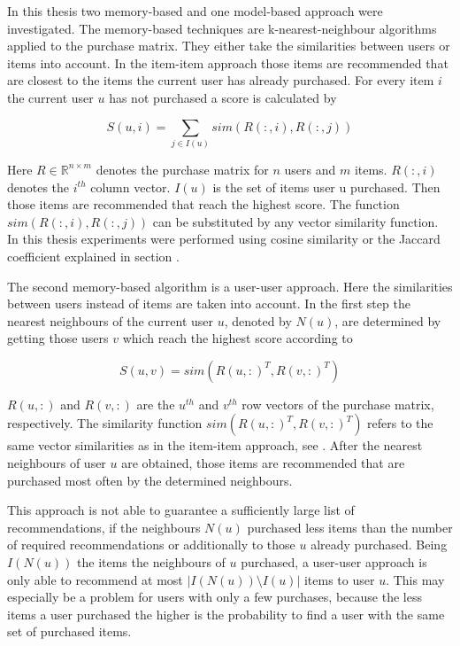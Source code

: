 \documentclass[10pt]{reportMaster}
\begin{document}
In this thesis two memory-based and one model-based approach were investigated.
The memory-based techniques are k-nearest-neighbour algorithms applied to the purchase matrix.
They either take the similarities between users or items into account. %
In the item-item approach those items are recommended that are closest to the items the current user has already purchased.
For every item $i$ the current user $u$ has not purchased a score is calculated by

\begin{equation}
	 S(u,i) = \sum_{j \in I(u)}{sim(R(:,i), R(:,j))}
\end{equation}

Here $R \in \mathds{R}^{n \times m}$ denotes the purchase matrix for $n$ users and $m$ items. $R(:,i)$ denotes the $i^{th}$ column vector. $I(u)$ is the set of items user u purchased.
Then those items are recommended that reach the highest score. %
The function $sim(R(:,i), R(:,j))$ can be substituted by any vector similarity function.
In this thesis experiments were performed using cosine similarity or the Jaccard coefficient explained in section . %

The second memory-based algorithm is a user-user approach.
Here the similarities between users instead of items are taken into account.
In the first step the nearest neighbours of the current user $u$, denoted by $N(u)$, are determined by getting those users $v$ which reach the highest score according to

\begin{equation}
	S(u,v) = sim(R(u,:)^T, R(v, :)^T)
\end{equation}

$R(u,:)$ and $R(v,:)$ are the $u^{th}$ and $v^{th}$ row vectors of the purchase matrix, respectively.
The similarity function $sim(R(u,:)^T, R(v, :)^T)$ refers to the same vector similarities as in the item-item approach, see . %
After the nearest neighbours of user $u$ are obtained, those items are recommended that are purchased most often by the determined neighbours. %

This approach is not able to guarantee a sufficiently large list of recommendations, if the neighbours $N(u)$ purchased less items than the number of required recommendations or additionally to those $u$ already purchased.
Being $I(N(u))$ the items the neighbours of $u$ purchased, a user-user approach is only able to recommend at most $|I(N(u)) \setminus I(u)|$ items to user $u$.
This may especially be a problem for users with only a few purchases, because the less items a user purchased the higher is the probability to find a user with the same set of purchased items.
\end{document}
